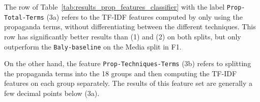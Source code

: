 
The row of Table~\ref{tab:results_prop_features_classifier} with the label \texttt{Prop-Total-Terms} (3a) refers to the TF-IDF features computed by only using the propaganda terms, without differentiating between the different techniques.
This row has significantly better results than (1) and (2) on both splits, but only outperform the \texttt{Baly-baseline}  on the Media split in F1. %

On the other hand, the feature \texttt{Prop-Techniques-Terms} (3b) refers to splitting the propaganda terms into the 18 groups and then computing the TF-IDF features on each group separately. The results of this feature set are generally a few decimal points below (3a).





